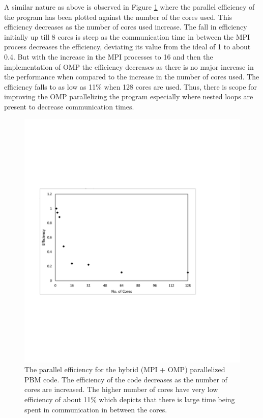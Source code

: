 \documentclass[preprint,11pt,authoryear]{elsarticle}
\begin{document}
A similar nature as above is observed in Figure \ref{fig:rslts_PBM_parallel_efficiency} where the parallel 
efficiency of the program has been plotted against the number of the cores used. This efficiency 
decreases as the number of cores used increase. The fall in efficiency initially up till 8 cores is steep as 
the communication time in between the MPI process decreases the efficiency, deviating its value from 
the ideal of 1 to about 0.4. But with the increase in the MPI processes to 16 and then the 
implementation of OMP the efficiency decreases as there is no major increase in the performance 
when compared to the increase in the number of cores used. The efficiency falls to as low as 11\% 
when 128 cores are used. Thus, there is scope for improving the OMP parallelizing the program 
especially where nested loops are present to decrease communication times.

\begin{figure}[H]
\centering
\includegraphics[scale=0.7]{rslts_PBM_Efficiency.pdf}
\caption{The parallel efficiency for the hybrid (MPI + OMP) parallelized PBM code. The efficiency of the 
code decreases as the number of cores are increased. The higher number of cores have very low 
efficiency of about 11\% which depicts that there is large time being spent in communication in 
between the cores.}
\label{fig:rslts_PBM_parallel_efficiency}
\end{figure}
\end{document}
